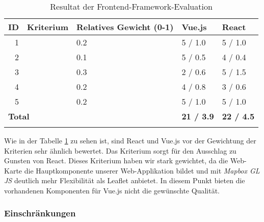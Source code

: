 \begin{longtable}{r l p{3cm} l l}
    \toprule
    \textbf{ID} &
        \textbf{Kriterium} 
                                                    & \textbf{Relatives Gewicht (0-1)} &
                                                                                  \textbf{Vue.js} &
                                                                                                  \textbf{React} \\
    \midrule
    1     & \nameref{Analyse Framework:Funktionsumfang}           & 0.2           & 5 / 1.0   & 5 / 1.0  \\
    2     & \nameref{Analyse Framework:Integration Leaflet}       & 0.1           & 5 / 0.5   & 4 / 0.4  \\
    3     & \nameref{Analyse Framework:Integration Vector Tiles}  & 0.3           & 2 / 0.6   & 5 / 1.5  \\
    4     & \nameref{Analyse Framework:Lernkurve}                 & 0.2           & 4 / 0.8   & 3 / 0.6  \\
    5     & \nameref{Analyse Framework:Tooling}                   & 0.2           & 5 / 1.0   & 5 / 1.0  \\
    \bottomrule
    \multicolumn{3}{l}{\textbf{Total}}                                            & \textbf{21 / 3.9}
                                                                                            & \textbf{22 / 4.5} \\
    \caption{Resultat der Frontend-Framework-Evaluation}
    \label{table:Resultat der Frontend-Framework-Evaluation}
\end{longtable}

Wie in der Tabelle \ref{table:Resultat der Frontend-Framework-Evaluation} zu sehen ist, sind React und Vue.js vor der Gewichtung der Kriterien sehr ähnlich bewertet.
Das Kriterium  sorgt für den Ausschlag zu Gunsten von React.
Dieses Kriterium haben wir stark gewichtet, da die Web-Karte die Hauptkomponente unserer Web-Applikation bildet und mit \emph{Mapbox GL JS} deutlich mehr Flexibilität als Leaflet anbietet.
In diesem Punkt bieten die vorhandenen Komponenten für Vue.js nicht die gewünschte Qualität.


\subsubsection{Einschränkungen}
\label{Analyse:Einschränkungen}

